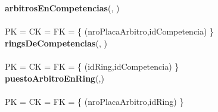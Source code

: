 \noindent\textbf{arbitrosEnCompetencias}(, )
\\
\\
PK = CK = FK = \{ (nroPlacaArbitro,idCompetencia) \} \\

\noindent\textbf{ringsDeCompetencias}(, )
\\
\\
PK = CK = FK = \{ (idRing,idCompetencia) \} \\

\noindent\textbf{puestoArbitroEnRing}(,)
\\
\\
PK = CK = FK = \{ (nroPlacaArbitro,idRing) \} \\
